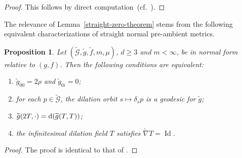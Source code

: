 \documentclass[10pt,a4paper]{amsart}
\numberwithin{equation}{section}
\newtheorem{Proposition}[Theorem]{Proposition}
 { \theoremstyle{definition}
\newtheorem{Definition}[Theorem]{Definition}
\newtheorem{Note}[Theorem]{Note}
\newtheorem{Example}[Theorem]{Example}
\newtheorem{Remark}[Theorem]{Remark} }
\begin{document}
\begin{proof}This follows by direct computation~(cf.\ \cite[Lemma 3.2]{FeffermanGraham2012}).
\end{proof}

The relevance of Lemma~\ref{straight-zero-theorem} stems from the following equivalent characterizations of straight normal pre-ambient metrics.
\begin{Proposition}
\label{straightproperties}
Let $(\widetilde{\mathcal{G}},\widetilde{g},\widetilde{f},m,\mu)$, $d\geq 3$ and $m<\infty$, be in normal form relative to $(g,f)$. Then the following conditions are equivalent:
\begin{enumerate}[label=$(\roman*)$]\itemsep=0pt
\item $\widetilde{g}_{00}=2\rho$ and $\widetilde{g}_{0i}=0$;

\item for each $p\in \widetilde{\mathcal{G}}$, the dilation orbit $s\mapsto \delta_s p$ is a geodesic for $\widetilde{g}$;

\item $\widetilde{g}(2T,\cdot)={\rm d}(\widetilde{g}(T,T))$;

\item the infinitesimal dilation field $T$ satisfies $\widetilde{\nabla}T=\operatorname{Id}$.
\end{enumerate}
\end{Proposition}

\begin{proof}
The proof is identical to that of \cite[Proposition 3.4]{FeffermanGraham2012}.
\end{proof}
\end{document}
